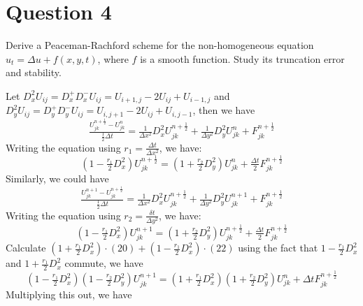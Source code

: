 \section{Question 4}

\begin{question}
    Derive a Peaceman-Rachford scheme for the non-homogeneous equation $u_t=\Delta u+f(x, y, t)$, where $f$ is a smooth function. Study its truncation error and stability.
\end{question}

\begin{answer}
    Let $D_x^2U_{ij} = D_x^{+}D_x^{-}U_{ij} = U_{i+1,j} - 2U_{ij} + U_{i-1,j}$ and $D_y^2U_{ij} = D_y^{+}D_y^{-}U_{ij} = U_{i,j+1} - 2U_{ij} + U_{i,j-1}$, then we have
    \begin{equation}
        \tfrac{U_{jk}^{n+\frac{1}{2}} - U_{jk}^n}{\frac{1}{2}\Delta t} = \tfrac{1}{\Delta x^2}D_x^2 U_{jk}^{n + \frac{1}{2}} + \tfrac{1}{\Delta y^2}D_y^2U_{jk}^n + F_{jk}^{n+\frac{1}{2}}
    \end{equation}
    Writing the equation using $r_1 = \tfrac{\Delta t}{\Delta x^2}$, we have:
    \begin{equation}\label{eqn:eqn3}
        (1-\tfrac{r_1}{2}D_x^2)U_{jk}^{n+\frac{1}{2}} = (1 + \tfrac{r_2}{2}D_y^2)U_{jk}^{n} + \tfrac{\Delta t}{2} F_{jk}^{n + \frac{1}{2}}
    \end{equation}
    Similarly, we could have
    \begin{equation}
        \tfrac{U_{jk}^{n+1} - U_{jk}^{n+\frac{1}{2}}}{\frac{1}{2}\Delta t} = \tfrac{1}{\Delta x^2}D_x^2 U_{jk}^{n + \frac{1}{2}} + \tfrac{1}{\Delta y^2}D_y^2U_{jk}^{n+1} + F_{jk}^{n+\frac{1}{2}}
    \end{equation}
    Writing the equation using $r_2 = \tfrac{\delta t}{\Delta y^2}$, we have:
    \begin{equation}\label{eqn:eqn4}
        (1-\tfrac{r_1}{2}D_x^2)U_{jk}^{n+1} = (1 + \tfrac{r_2}{2}D_y^2)U_{jk}^{n+\frac{1}{2}} + \tfrac{\Delta t}{2} F_{jk}^{n + \frac{1}{2}}
    \end{equation}
    Calculate $(1+\tfrac{r_1}{2}D_x^2)\cdot(20)+(1-\tfrac{r_1}{2}D_x^2)\cdot(22)$ using the fact that $1-\tfrac{r_1}{2}D_x^2$ and $1+\tfrac{r_1}{2}D_x^2$ commute, we have
    \begin{equation}
        (1-\tfrac{r_1}{2}D_x^2)(1-\tfrac{r_2}{2}D_y^2)U_{jk}^{n+1} = (1+\tfrac{r_1}{2}D_x^2)(1+\tfrac{r_2}{2}D_y^2)U_{jk}^n + \Delta t F_{jk}^{n+\frac{1}{2}}
    \end{equation}
    Multiplying this out, we have

\end{answer}
